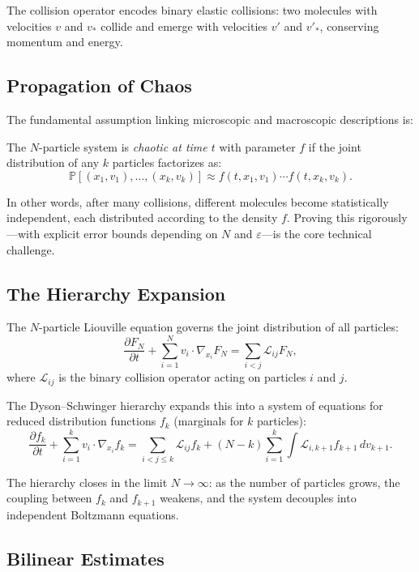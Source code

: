 The collision operator encodes binary elastic collisions: two molecules with velocities $v$ and $v_*$ collide and emerge with velocities $v'$ and $v'_*$, conserving momentum and energy.

\subsection{Propagation of Chaos}

The fundamental assumption linking microscopic and macroscopic descriptions is:

\begin{definition}
The $N$-particle system is \emph{chaotic at time $t$} with parameter $f$ if the joint distribution of any $k$ particles factorizes as:
\[
\mathbb{P}[(x_1, v_1), \ldots, (x_k, v_k)] \approx f(t, x_1, v_1) \cdots f(t, x_k, v_k).
\]
\end{definition}

In other words, after many collisions, different molecules become statistically independent, each distributed according to the density $f$. Proving this rigorously---with explicit error bounds depending on $N$ and $\varepsilon$---is the core technical challenge.

\subsection{The Hierarchy Expansion}

The $N$-particle Liouville equation governs the joint distribution of all particles:
\[
\frac{\partial F_N}{\partial t} + \sum_{i=1}^{N} v_i \cdot \nabla_{x_i} F_N = \sum_{i < j} \mathcal{L}_{ij} F_N,
\]
where $\mathcal{L}_{ij}$ is the binary collision operator acting on particles $i$ and $j$.

The Dyson--Schwinger hierarchy expands this into a system of equations for reduced distribution functions $f_k$ (marginals for $k$ particles):
\[
\frac{\partial f_k}{\partial t} + \sum_{i=1}^{k} v_i \cdot \nabla_{x_i} f_k = \sum_{i < j \le k} \mathcal{L}_{ij} f_k + (N - k) \sum_{i=1}^{k} \int \mathcal{L}_{i, k+1} f_{k+1} \, dv_{k+1}.
\]

The hierarchy closes in the limit $N \to \infty$: as the number of particles grows, the coupling between $f_k$ and $f_{k+1}$ weakens, and the system decouples into independent Boltzmann equations.

\subsection{Bilinear Estimates}

